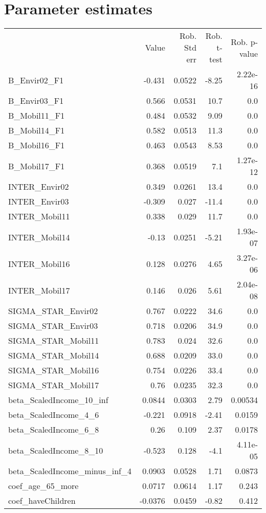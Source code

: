 \section{Parameter estimates}
\begin{tabular}{lrrrr}
 & Value & Rob. Std err & Rob. t-test & Rob. p-value \\
B_Envir02_F1 & -0.431 & 0.0522 & -8.25 & 2.22e-16 \\
B_Envir03_F1 & 0.566 & 0.0531 & 10.7 & 0.0 \\
B_Mobil11_F1 & 0.484 & 0.0532 & 9.09 & 0.0 \\
B_Mobil14_F1 & 0.582 & 0.0513 & 11.3 & 0.0 \\
B_Mobil16_F1 & 0.463 & 0.0543 & 8.53 & 0.0 \\
B_Mobil17_F1 & 0.368 & 0.0519 & 7.1 & 1.27e-12 \\
INTER_Envir02 & 0.349 & 0.0261 & 13.4 & 0.0 \\
INTER_Envir03 & -0.309 & 0.027 & -11.4 & 0.0 \\
INTER_Mobil11 & 0.338 & 0.029 & 11.7 & 0.0 \\
INTER_Mobil14 & -0.13 & 0.0251 & -5.21 & 1.93e-07 \\
INTER_Mobil16 & 0.128 & 0.0276 & 4.65 & 3.27e-06 \\
INTER_Mobil17 & 0.146 & 0.026 & 5.61 & 2.04e-08 \\
SIGMA_STAR_Envir02 & 0.767 & 0.0222 & 34.6 & 0.0 \\
SIGMA_STAR_Envir03 & 0.718 & 0.0206 & 34.9 & 0.0 \\
SIGMA_STAR_Mobil11 & 0.783 & 0.024 & 32.6 & 0.0 \\
SIGMA_STAR_Mobil14 & 0.688 & 0.0209 & 33.0 & 0.0 \\
SIGMA_STAR_Mobil16 & 0.754 & 0.0226 & 33.4 & 0.0 \\
SIGMA_STAR_Mobil17 & 0.76 & 0.0235 & 32.3 & 0.0 \\
beta_ScaledIncome_10_inf & 0.0844 & 0.0303 & 2.79 & 0.00534 \\
beta_ScaledIncome_4_6 & -0.221 & 0.0918 & -2.41 & 0.0159 \\
beta_ScaledIncome_6_8 & 0.26 & 0.109 & 2.37 & 0.0178 \\
beta_ScaledIncome_8_10 & -0.523 & 0.128 & -4.1 & 4.11e-05 \\
beta_ScaledIncome_minus_inf_4 & 0.0903 & 0.0528 & 1.71 & 0.0873 \\
coef_age_65_more & 0.0717 & 0.0614 & 1.17 & 0.243 \\
coef_haveChildren & -0.0376 & 0.0459 & -0.82 & 0.412 \\

\end{tabular}

